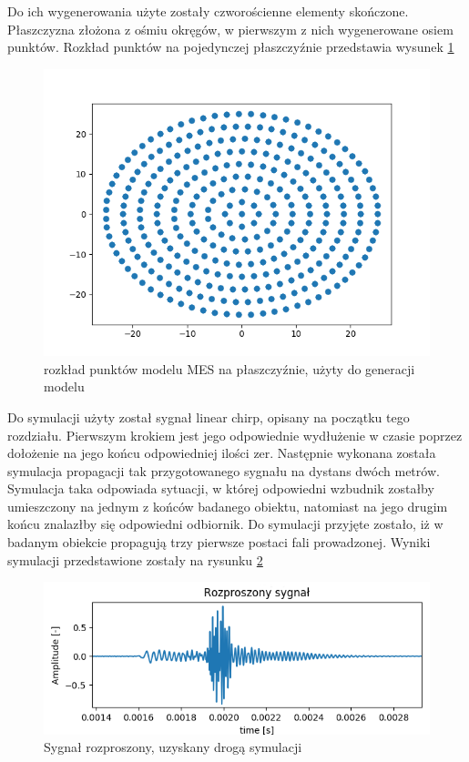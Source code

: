 Do ich wygenerowania użyte zostały czworościenne elementy skończone. Płaszczyzna złożona z ośmiu okręgów, w pierwszym z nich wygenerowane osiem punktów. Rozkład punktów na pojedynczej płaszczyźnie przedstawia wysunek \ref{fig:punktynaplaszczyznie}

\begin{figure}[h]
\centering
\includegraphics[width=14cm]{Zdjecia/4/siatka}
\caption{rozkład punktów modelu MES na płaszczyźnie, użyty do generacji modelu}
\label{fig:punktynaplaszczyznie}
\end{figure}

Do symulacji użyty został sygnał linear chirp, opisany na początku tego rozdziału. Pierwszym krokiem jest jego odpowiednie wydłużenie w czasie poprzez dołożenie na jego końcu odpowiedniej ilości zer. Następnie wykonana została symulacja propagacji tak przygotowanego sygnału na dystans dwóch metrów. Symulacja taka odpowiada sytuacji, w której odpowiedni wzbudnik zostałby umieszczony na jednym z końców badanego obiektu, natomiast na jego drugim końcu znalazłby się odpowiedni odbiornik. Do symulacji przyjęte zostało, iż w badanym obiekcie propagują trzy pierwsze postaci fali prowadzonej. Wyniki symulacji przedstawione zostały na rysunku \ref{fig:sygnalrozproszony}

\begin{figure}[h]
\centering
\includegraphics[width=14cm]{Zdjecia/4/sygnalrozproszony}
\caption{Sygnał rozproszony, uzyskany drogą symulacji}
\label{fig:sygnalrozproszony}
\end{figure}

